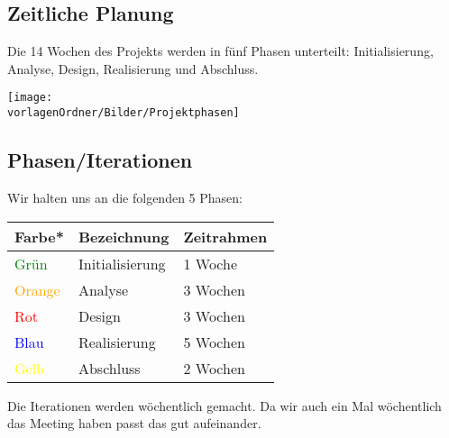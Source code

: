\documentclass[
	ngerman,
	toc=listof, %
	toc=bibliography, %
	footnotes=multiple, %
	parskip=half, %
	numbers=noendperiod %
]{scrartcl}
\newcommand{\vorlagenOrdner}{../../99_Vorlagen} %
\begin{document}
	\subsection{Zeitliche Planung}
		Die 14 Wochen des Projekts werden in fünf Phasen unterteilt: Initialisierung, Analyse, Design, Realisierung und Abschluss.
		\begin{center}
			\label{ZeitplanOverview}
			\texttt{[image: \\vorlagenOrdner/Bilder/Projektphasen]}
		\end{center}

	\subsection{Phasen/Iterationen}
		Wir halten uns an die folgenden 5 Phasen: \\
		\begin{tabularx}{\textwidth}{lll}
			\toprule
			Farbe* & Bezeichnung & Zeitrahmen \\
			\midrule
			\textcolor{green}{Grün} & Initialisierung & 1 Woche \\
			\textcolor{orange}{Orange} & Analyse & 3 Wochen \\
			\textcolor{red}{Rot} & Design & 3 Wochen \\
			\textcolor{blue}{Blau} & Realisierung & 5 Wochen \\
			\textcolor{yellow}{Gelb} & Abschluss & 2 Wochen \\
			\bottomrule
		\end{tabularx}
	
		Die Iterationen werden wöchentlich gemacht. Da wir auch ein Mal wöchentlich das Meeting haben passt das gut aufeinander.
\end{document}
